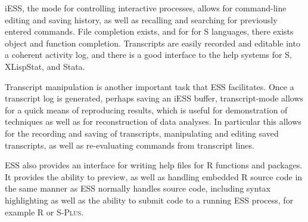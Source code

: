 \documentclass{article}
\newcommand*{\Splus}{\textsc{S-Plus}}
\begin{document}
iESS, the mode for controlling interactive processes, allows for
command-line editing and saving history, as well as recalling and
searching for previously entered commands.  File completion exists,
and for for S languages, there exists object and function completion.
Transcripts are easily recorded and editable into a coherent activity
log, and there is a good interface to the help systems for S,
XLispStat, and Stata.

Transcript manipulation is another important task that ESS
facilitates.  Once a transcript log is generated, perhaps saving an
iESS buffer, transcript-mode allows for a quick means of reproducing
results, which is useful for demonstration of techniques as well as
for reconstruction of data analyses.  In particular this allows for
the recording and saving of transcripts, manipulating and editing
saved transcripts, as well as re-evaluating commands from transcript
lines. 

ESS also provides an interface for writing help files for R functions
and packages.    It provides the ability to preview, as well as
handling embedded R source code in the same manner as ESS normally
handles source code, including syntax highlighting as well as the
ability to submit code to a running ESS process, for example R or
\Splus. 
\end{document}
